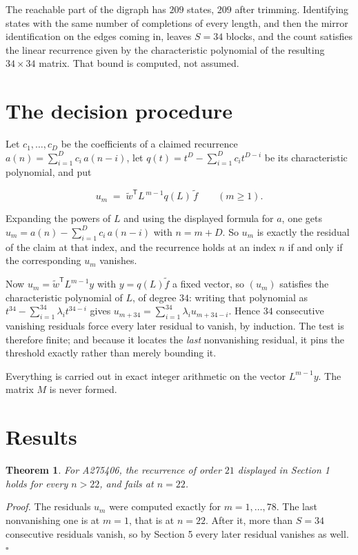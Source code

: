 \documentclass[11pt]{article}
\newtheorem{theorem}{Theorem}
\theoremstyle{definition}
\begin{document}
The reachable part of the digraph has $209$ states, $209$ after trimming. Identifying states with the same number of completions of every length, and then the mirror identification on the edges coming in, leaves $S = 34$ blocks, and the count satisfies the linear recurrence given by the characteristic polynomial of the resulting $34\times34$ matrix. That bound is computed, not assumed.

\section{The decision procedure}

Let $c_1,\dots,c_D$ be the coefficients of a claimed recurrence $a(n) = \sum_{i=1}^{D} c_i\,a(n-i)$, let $q(t) = t^{D} - \sum_{i=1}^{D} c_i t^{D-i}$ be its characteristic polynomial, and put

\[u_m \;=\; \tilde w^{\mathsf T} L^{\,m-1} q(L)\,\tilde f \qquad (m \ge 1).\]

Expanding the powers of $L$ and using the displayed formula for $a$, one gets $u_m = a(n) - \sum_{i=1}^{D} c_i\,a(n-i)$ with $n = m + D$. So $u_m$ is exactly the residual of the claim at that index, and the recurrence holds at an index $n$ if and only if the corresponding $u_m$ vanishes.

Now $u_m = \tilde w^{\mathsf T} L^{m-1} y$ with $y = q(L)\tilde f$ a fixed vector, so $(u_m)$ satisfies the characteristic polynomial of $L$, of degree $34$: writing that polynomial as $t^{34} - \sum_{i=1}^{34} \lambda_i t^{34-i}$ gives $u_{m+34} = \sum_{i=1}^{34} \lambda_i u_{m+34-i}$. Hence $34$ consecutive vanishing residuals force every later residual to vanish, by induction. The test is therefore finite; and because it locates the {\itshape last} nonvanishing residual, it pins the threshold exactly rather than merely bounding it.

Everything is carried out in exact integer arithmetic on the vector $L^{m-1}y$. The matrix $M$ is never formed.

\section{Results}

\begin{theorem} For A275406, the recurrence of order $21$ displayed in Section 1 holds for every $n > 22$, and fails at $n = 22$.\end{theorem}

{\itshape Proof.} The residuals $u_m$ were computed exactly for $m = 1,\dots,78$. The last nonvanishing one is at $m = 1$, that is at $n = 22$. After it, more than $S = 34$ consecutive residuals vanish, so by Section 5 every later residual vanishes as well. $\square$
\end{document}

